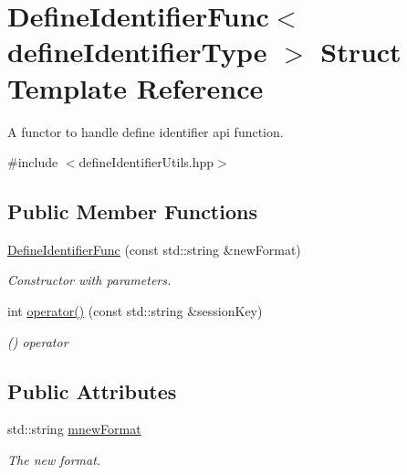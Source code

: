 \hypertarget{structDefineIdentifierFunc}{
\section{DefineIdentifierFunc$<$ defineIdentifierType $>$ Struct Template Reference}
\label{structDefineIdentifierFunc}
}


A functor to handle define identifier api function.  




{\ttfamily \#include $<$defineIdentifierUtils.hpp$>$}

\subsection*{Public Member Functions}
\begin{DoxyCompactItemize}
\item 
\hyperlink{structDefineIdentifierFunc_ae82d70ecd0684ba7e2d25990f0435038}{DefineIdentifierFunc} (const std::string \&newFormat)
\begin{DoxyCompactList}\small\item\em Constructor with parameters. \item\end{DoxyCompactList}\item 
int \hyperlink{structDefineIdentifierFunc_aa41816da11f33dd30546a9571d7b9375}{operator()} (const std::string \&sessionKey)
\begin{DoxyCompactList}\small\item\em () operator \item\end{DoxyCompactList}\end{DoxyCompactItemize}
\subsection*{Public Attributes}
\begin{DoxyCompactItemize}
\item 
\hypertarget{structDefineIdentifierFunc_a38e539e8a79a4986e4a0137c09d00351}{
std::string \hyperlink{structDefineIdentifierFunc_a38e539e8a79a4986e4a0137c09d00351}{mnewFormat}}
\label{structDefineIdentifierFunc_a38e539e8a79a4986e4a0137c09d00351}

\begin{DoxyCompactList}\small\item\em The new format. \item\end{DoxyCompactList}\end{DoxyCompactItemize}


